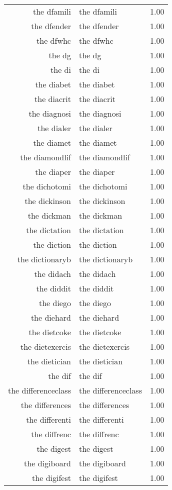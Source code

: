 \begin{table}[ht]
\begin{tabular}{rlr}
  the dfamili & the dfamili & 1.00 \\ 
  the dfender & the dfender & 1.00 \\ 
  the dfwhc & the dfwhc & 1.00 \\ 
  the dg & the dg & 1.00 \\ 
  the di & the di & 1.00 \\ 
  the diabet & the diabet & 1.00 \\ 
  the diacrit & the diacrit & 1.00 \\ 
  the diagnosi & the diagnosi & 1.00 \\ 
  the dialer & the dialer & 1.00 \\ 
  the diamet & the diamet & 1.00 \\ 
  the diamondlif & the diamondlif & 1.00 \\ 
  the diaper & the diaper & 1.00 \\ 
  the dichotomi & the dichotomi & 1.00 \\ 
  the dickinson & the dickinson & 1.00 \\ 
  the dickman & the dickman & 1.00 \\ 
  the dictation & the dictation & 1.00 \\ 
  the diction & the diction & 1.00 \\ 
  the dictionaryb & the dictionaryb & 1.00 \\ 
  the didach & the didach & 1.00 \\ 
  the diddit & the diddit & 1.00 \\ 
  the diego & the diego & 1.00 \\ 
  the diehard & the diehard & 1.00 \\ 
  the dietcoke & the dietcoke & 1.00 \\ 
  the dietexercis & the dietexercis & 1.00 \\ 
  the dietician & the dietician & 1.00 \\ 
  the dif & the dif & 1.00 \\ 
  the differenceclass & the differenceclass & 1.00 \\ 
  the differences & the differences & 1.00 \\ 
  the differenti & the differenti & 1.00 \\ 
  the diffrenc & the diffrenc & 1.00 \\ 
  the digest & the digest & 1.00 \\ 
  the digiboard & the digiboard & 1.00 \\ 
  the digifest & the digifest & 1.00 \\ 

\end{tabular}
\end{table}
